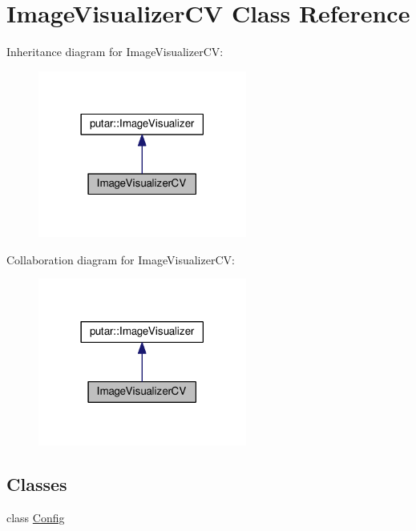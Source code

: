 \hypertarget{classImageVisualizerCV}{}\section{Image\+Visualizer\+CV Class Reference}
\label{classImageVisualizerCV}


Inheritance diagram for Image\+Visualizer\+CV\+:
\nopagebreak
\begin{figure}[H]
\begin{center}
\leavevmode
\includegraphics[width=194pt]{classImageVisualizerCV__inherit__graph}
\end{center}
\end{figure}


Collaboration diagram for Image\+Visualizer\+CV\+:
\nopagebreak
\begin{figure}[H]
\begin{center}
\leavevmode
\includegraphics[width=194pt]{classImageVisualizerCV__coll__graph}
\end{center}
\end{figure}
\subsection*{Classes}
\begin{DoxyCompactItemize}
\item 
class \hyperlink{classImageVisualizerCV_1_1Config}{Config}
\end{DoxyCompactItemize}
